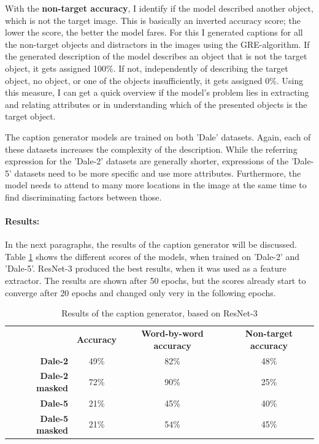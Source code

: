 With the \textbf{non-target accuracy}, I identify if the model described another object, which is not the target image.
This is basically an inverted accuracy score; the lower the score, the better the model fares.
For this I generated captions for all the non-target objects and distractors in the images using the GRE-algorithm.
If the generated description of the model describes an object that is not the target object, it gets assigned 100\%.
If not, independently of describing the target object, no object, or one of the objects insufficiently, it gets assigned 0\%.
Using this measure, I can get a quick overview if the model's problem lies in extracting and relating attributes or in understanding which of the presented objects is the target object.

The caption generator models are trained on both 'Dale' datasets.
Again, each of these datasets increases the complexity of the description.
While the referring expression for the 'Dale-2' datasets are generally shorter, expressions of the 'Dale-5' datasets need to be more specific and use more attributes.
Furthermore, the model needs to attend to many more locations in the image at the same time to find discriminating factors between those.


\paragraph*{Results:}
In the next paragraphs, the results of the caption generator will be discussed.
Table \ref{tab:results_caption-generator} shows the different scores of the models, when trained on 'Dale-2' and 'Dale-5'.
ResNet-3 produced the best results, when it was used as a feature extractor.
The results are shown after 50 epochs, but the scores already start to converge after 20 epochs and changed only very in the following epochs.

\begin{table}[h]
    \centering
    \begin{tabular}{rccc}
        \toprule
                               & \textbf{Accuracy} & \textbf{Word-by-word accuracy} & \textbf{Non-target accuracy} \\
        \textbf{Dale-2}        & 49\%              & 82\%                           & 48\%                         \\
        \textbf{Dale-2 masked} & 72\%              & 90\%                           & 25\%                         \\
        \textbf{Dale-5}        & 21\%              & 45\%                           & 40\%                         \\
        \textbf{Dale-5 masked} & 21\%              & 54\%                           & 45\%                         \\
        \bottomrule
    \end{tabular}
    \caption{Results of the caption generator, based on ResNet-3}
    \label{tab:results_caption-generator}
\end{table}

